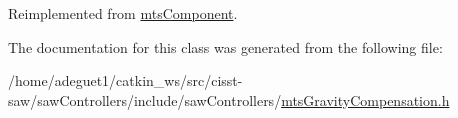 Reimplemented from \hyperlink{classmts_component_aaf28f0262b44eb6866e10089a02fa6e4}{mts\-Component}.



The documentation for this class was generated from the following file\-:\begin{DoxyCompactItemize}
\item 
/home/adeguet1/catkin\-\_\-ws/src/cisst-\/saw/saw\-Controllers/include/saw\-Controllers/\hyperlink{mts_gravity_compensation_8h}{mts\-Gravity\-Compensation.\-h}\end{DoxyCompactItemize}
